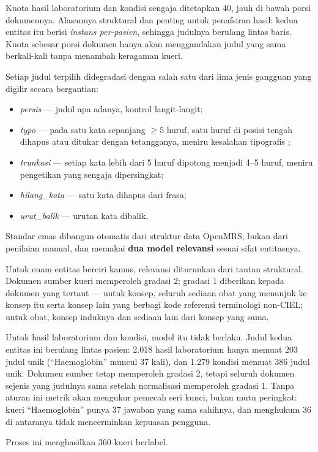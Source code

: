 \documentclass[journal,twoside,web]{ieeecolor}
\begin{document}
Kuota hasil laboratorium dan kondisi sengaja ditetapkan 40, jauh di bawah porsi
dokumennya. Alasannya struktural dan penting untuk penafsiran hasil: kedua
entitas itu berisi \emph{instans per-pasien}, sehingga judulnya berulang lintas
baris. Kuota sebesar porsi dokumen hanya akan menggandakan judul yang sama
berkali-kali tanpa menambah keragaman kueri.

Setiap judul terpilih didegradasi dengan salah satu dari lima jenis gangguan yang
digilir secara bergantian:
\begin{itemize}
\item \emph{persis} --- judul apa adanya, kontrol langit-langit;
\item \emph{typo} --- pada satu kata sepanjang $\ge 5$ huruf, satu huruf di
posisi tengah dihapus atau ditukar dengan tetangganya, meniru kesalahan
tipografis \cite{damerau1964};
\item \emph{trunkasi} --- setiap kata lebih dari 5 huruf dipotong menjadi 4--5
huruf, meniru pengetikan yang sengaja dipersingkat;
\item \emph{hilang\_kata} --- satu kata dihapus dari frasa;
\item \emph{urut\_balik} --- urutan kata dibalik.
\end{itemize}

Standar emas dibangun otomatis dari struktur data OpenMRS, bukan dari penilaian
manual, dan memakai \textbf{dua model relevansi} sesuai sifat entitasnya.

Untuk enam entitas berciri kamus, relevansi diturunkan dari tautan struktural.
Dokumen sumber kueri memperoleh gradasi 2; gradasi 1 diberikan kepada dokumen
yang tertaut --- untuk konsep, seluruh sediaan obat yang menunjuk ke konsep itu
serta konsep lain yang berbagi kode referensi terminologi non-CIEL; untuk obat,
konsep induknya dan sediaan lain dari konsep yang sama.

Untuk hasil laboratorium dan kondisi, model itu tidak berlaku. Judul kedua
entitas ini berulang lintas pasien: 2.018 hasil laboratorium hanya memuat 203
judul unik (``Haemoglobin'' muncul 37 kali), dan 1.279 kondisi memuat 386 judul
unik. Dokumen sumber tetap memperoleh gradasi 2, tetapi seluruh dokumen sejenis
yang judulnya sama setelah normalisasi memperoleh gradasi 1. Tanpa aturan ini
metrik akan mengukur pemecah seri kunci, bukan mutu peringkat: kueri
``Haemoglobin'' punya 37 jawaban yang sama sahihnya, dan menghukum 36 di
antaranya tidak mencerminkan kepuasan pengguna.

Proses ini menghasilkan 360 kueri berlabel.
\end{document}
